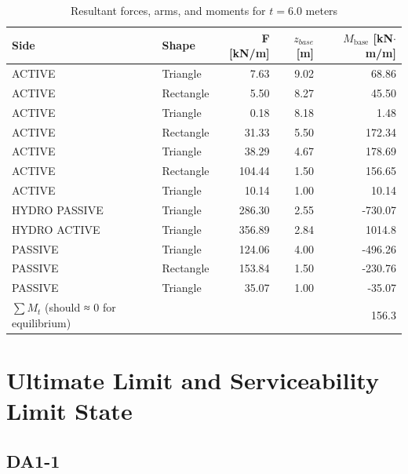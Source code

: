 \begin{table}[H]
  \centering
  \caption{Resultant forces, arms, and moments for $t = 6.0$ meters}
  \label{tab:appendix_forces_arms_moments_now}
  \small
  \setlength{\tabcolsep}{8pt}
  \renewcommand{\arraystretch}{1.15}
  \begin{tabular}{@{}l l r r r@{}}
    \toprule
    Side & Shape &
    F [kN/m] & $z_{base}$[m] &
    $M_{\text{base}}$ [kN$\cdot$m/m] \\
    \midrule
    ACTIVE & Triangle  &  7.63  & 9.02 &  68.86 \\
    ACTIVE & Rectangle &  5.50  & 8.27 &  45.50 \\
    ACTIVE & Triangle  &  0.18  & 8.18 &   1.48 \\
    ACTIVE & Rectangle & 31.33  & 5.50 & 172.34 \\
    ACTIVE & Triangle  & 38.29  & 4.67 & 178.69 \\
    ACTIVE & Rectangle & 104.44  & 1.50 & 156.65 \\
    ACTIVE & Triangle  & 10.14  & 1.00 &  10.14 \\
    HYDRO PASSIVE & Triangle  & 286.30  & 2.55 &  -730.07 \\
    HYDRO ACTIVE & Triangle  & 356.89  & 2.84 &  1014.8 \\
    PASSIVE & Triangle  & 124.06 & 4.00 & -496.26 \\
    PASSIVE & Rectangle & 153.84 & 1.50 & -230.76 \\
    PASSIVE & Triangle  &  35.07 & 1.00 &  -35.07 \\
    \midrule
    $\sum{M_{t}}$ (should ≈ 0 for equilibrium) &  &  & & 156.3 \\
    \bottomrule
  \end{tabular}
\end{table}

\section{Ultimate Limit and Serviceability Limit State}
\label{appendix:uls_combinations}

\subsection{DA1-1}

